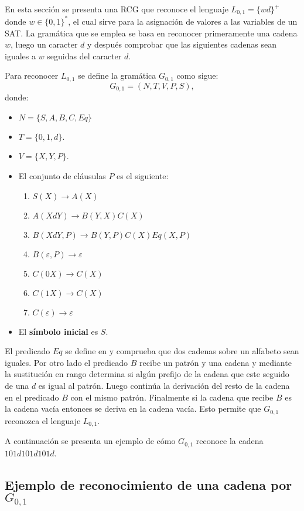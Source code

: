 \documentclass[12pt]{article}
\begin{document}
En esta sección se presenta una RCG que reconoce el lenguaje $L_{0,1}=\{wd\}^+$ donde $w\in \{0,1\}^*$, el cual sirve para la asignación
de valores a las variables de un SAT. La gramática que se emplea se basa en reconocer primeramente
una cadena $w$, luego un caracter $d$ y después comprobar que las siguientes cadenas sean iguales a $w$
seguidas del caracter $d$.

Para reconocer $L_{0,1}$ se define la gramática $G_{0,1}$ como sigue:
\[
    G_{0,1} = (N, T, V, P, S),
\]
donde:

\begin{itemize}
    \item $N=\{S,A,B,C,Eq\}$
    \item $T=\{0,1,d\}$.
    \item $V=\{X,Y,P\}$.
    \item El conjunto de cláusulas $P$ es el siguiente:
          \begin{enumerate}
              \item $S(X)\to A(X)$
              \item $A(XdY)\to B(Y,X)C(X)$
              \item $B(XdY,P)\to B(Y,P) C(X) Eq(X,P)$
              \item $B(\varepsilon,P)\to \varepsilon$
              \item $C(0X)\to C(X)$
              \item $C(1X)\to C(X)$
              \item $C(\varepsilon)\to \varepsilon$
          \end{enumerate}
    \item El \textbf{símbolo inicial} es $S$.
\end{itemize}

El predicado $Eq$ se define en \cite{mainRCGBib} y comprueba que dos cadenas sobre un alfabeto sean iguales.
Por otro lado el predicado $B$ recibe un patrón y una cadena y mediante la sustitución en rango determina
si algún prefijo de la cadena que este seguido de una $d$ es igual al patrón. Luego continúa la derivación
del resto de la cadena en el predicado $B$ con el mismo patrón. Finalmente si la cadena que recibe $B$ es la cadena
vacía entonces se deriva en la cadena vacía. Esto permite que $G_{0,1}$ reconozca el lenguaje $L_{0,1}$.

A continuación se presenta un ejemplo de cómo $G_{0,1}$ reconoce la cadena $101d101d101d$.

\subsection{Ejemplo de reconocimiento de una cadena por $G_{0,1}$}
\end{document}
